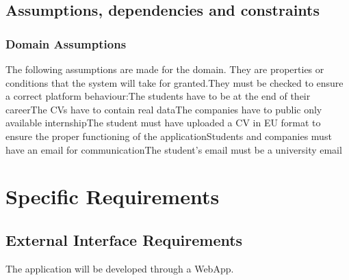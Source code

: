 \documentclass{article}
\begin{document}
\subsection{Assumptions, dependencies and constraints}
\subsubsection{Domain Assumptions}
The following assumptions are made for the domain. They are properties or conditions that the system will take for granted.They must be checked to ensure a correct platform behaviour:\newline
[D1] The students have to be at the end of their career\newline
[D2] The CVs have to contain real data\newline
[D3] The companies have to public only available internship\newline
[D4] The student must have uploaded a CV in EU format to ensure the proper functioning of the application\newline
[D5] Students and companies must have an email for communication\newline
[D6] The student's email must be a university email\newline


\section{Specific Requirements}
\subsection{External Interface Requirements }
The application will be developed through a WebApp.
\end{document}
